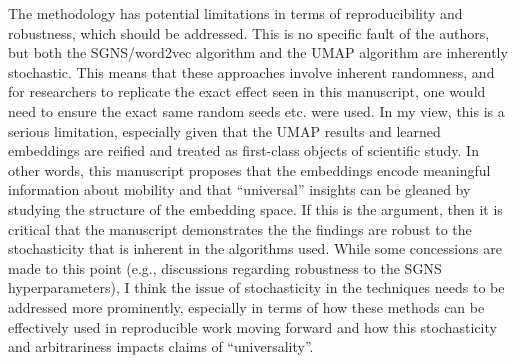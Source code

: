 \documentclass[12pt,a4paper]{article}
\newcommand{\rcomment}[1]{%
\vspace{10pt}
\begin{tcolorbox}[colback=black!3,colframe=white!45!black]
#1
\end{tcolorbox}
}
\begin{document}
\rcomment{%
The methodology has potential limitations in terms of reproducibility and robustness, which should be addressed. This is no specific fault of the authors, but both the SGNS/word2vec algorithm and the UMAP algorithm are inherently stochastic. This means that these approaches involve inherent randomness, and for researchers to replicate the exact effect seen in this manuscript, one would need to ensure the exact same random seeds etc. were used. In my view, this is a serious limitation, especially given that the UMAP results and learned embeddings are reified and treated as first-class objects of scientific study. In other words, this manuscript proposes that the embeddings encode meaningful information about mobility and that “universal” insights can be gleaned by studying the structure of the embedding space. If this is the argument, then it is critical that the manuscript demonstrates the the findings are robust to the stochasticity that is inherent in the algorithms used. While some concessions are made to this point (e.g., discussions regarding robustness to the SGNS hyperparameters), I think the issue of stochasticity in the techniques needs to be addressed more prominently, especially in terms of how these methods can be effectively used in reproducible work moving forward and how this stochasticity and arbitrariness impacts claims of “universality”.
}
\end{document}
